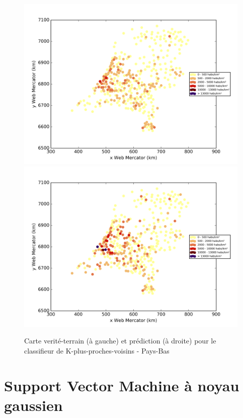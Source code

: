 \documentclass{book}
\begin{document}
\begin{figure}[H]
\centerline{
\includegraphics[scale=0.5]{../../data/Pays-Bas/test/Nearest_Neighboors_Classification/Nearest_Neighboors_Classification/density_ground_truth.png}
\includegraphics[scale=0.5]{../../data/Pays-Bas/test/Nearest_Neighboors_Classification/Nearest_Neighboors_Classification/density_classification.png}
}
\caption{Carte verité-terrain (à gauche) et prédiction (à droite) pour le classifieur de K-plus-proches-voisins - Pays-Bas}
\label{nn_carte_pays-bas}
\end{figure}


\section{Support Vector Machine à noyau gaussien}
\end{document}
